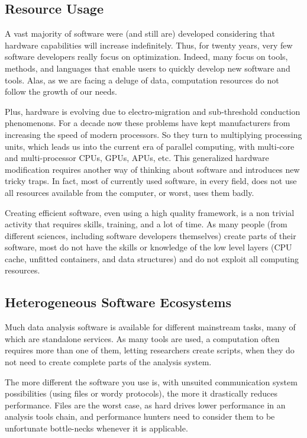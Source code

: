 		\subsection{Resource Usage}
			A vast majority of software were (and still are) developed considering that hardware capabilities will increase indefinitely. Thus, for twenty years, very few software developers really focus on optimization. Indeed, many focus on tools, methods, and languages that enable users to quickly develop new software and tools. Alas, as we are facing a deluge of data, computation resources do not follow the growth of our needs.
			
			Plus, hardware is evolving due to electro-migration and sub-threshold conduction phenomenons. For a decade now these problems have kept manufacturers from increasing the speed of modern processors. So they turn to multiplying processing units, which leads us into the current era of parallel computing, with multi-core and multi-processor CPUs, GPUs, APUs, etc. This generalized hardware modification requires another way of thinking about software and introduces new tricky traps. In fact, most of currently used software, in every field, does not use all resources available from the computer, or worst, uses them badly.
			
			Creating efficient software, even using a high quality framework, is a non trivial activity that requires skills, training, and a lot of time. As many people (from different sciences, including software developers themselves) create parts of their software, most do not have the skills or knowledge of the low level layers (CPU cache, unfitted containers, and data structures) and do not exploit all computing resources.

		\subsection{Heterogeneous Software Ecosystems}
			Much data analysis software is available for different mainstream tasks, many of which are standalone services. As many tools are used, a computation often requires more than one of them, letting researchers create scripts, when they do not need to create complete parts of the analysis system.
			
			The more different the software you use is, with unsuited communication system possibilities (using files or wordy protocols), the more it drastically reduces performance. Files are the worst case, as hard drives lower performance in an analysis tools chain, and performance hunters need to consider them to be unfortunate bottle-necks whenever it is applicable.

